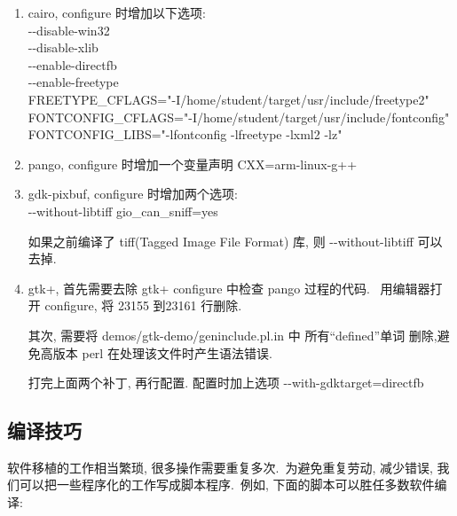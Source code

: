 \begin{enumerate}
  \item cairo,  configure 时增加以下选项:\\
      -{}-disable-win32 \\
      -{}-disable-xlib \\
      -{}-enable-directfb \\
      -{}-enable-freetype \\
      FREETYPE\_CFLAGS="-I/home/student/target/usr/include/freetype2" \\
      FONTCONFIG\_CFLAGS="-I/home/student/target/usr/include/fontconfig" \\
      FONTCONFIG\_LIBS="-lfontconfig -lfreetype -lxml2 -lz"

  \item pango, configure 时增加一个变量声明 CXX=arm-linux-g++

  \item gdk-pixbuf, configure 时增加两个选项:\\
      -{}-without-libtiff gio\_can\_sniff=yes

      如果之前编译了 tiff(Tagged Image File Format) 库, 则 -{}-without-libtiff 
      可以去掉.

  \item gtk+, 首先需要去除 gtk+ configure 中检查 pango 过程的代码.
      ~用编辑器打开 configure, 将 23155 到23161 行删除.

     其次, 需要将 demos/gtk-demo/geninclude.pl.in 中 所有``defined''单词
     删除,避免高版本 perl 在处理该文件时产生语法错误.

     打完上面两个补丁, 再行配置. 配置时加上选项 -{}-with-gdktarget=directfb \\

\end{enumerate}

\subsection{编译技巧}
    软件移植的工作相当繁琐, 很多操作需要重复多次.~为避免重复劳动, 减少错误,
我们可以把一些程序化的工作写成脚本程序.~例如, 下面的脚本可以胜任多数软件编译:

